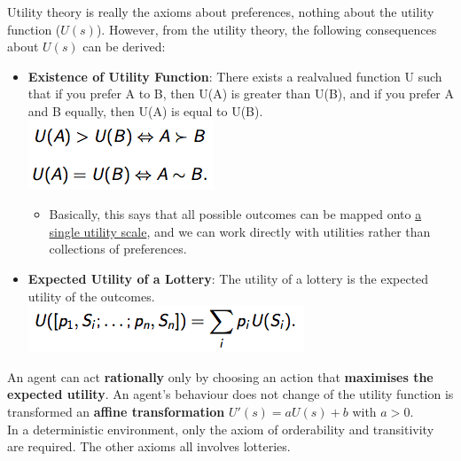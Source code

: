 \documentclass[12pt]{article}
\begin{document}
\begin{tcolorbox}
Utility theory is really the axioms about preferences, nothing about the utility function ($U(s)$). However, from the utility theory,  the following consequences about $U(s)$ can be derived:

\begin{itemize}
\item \textbf{Existence of Utility Function}: There exists a realvalued
function U such that if you prefer A to B, then U(A) is greater than
U(B), and if you prefer A and B equally, then U(A) is equal to U(B). \\

\includegraphics[scale=0.5]{p7}
\begin{itemize}
\item Basically, this says that all possible outcomes can be mapped onto \underline{a single
utility scale}, and we can work directly with utilities rather than collections of
preferences.
\end{itemize}

\item \textbf{Expected Utility of a Lottery}: The utility of a lottery is the expected
utility of the outcomes. \\

\includegraphics[scale=0.5]{p8}

\end{itemize}

An agent can act \textbf{rationally} only by choosing an action that \textbf{maximises the expected utility}.
An agent's behaviour does not change of the utility function is transformed an \textbf{affine transformation} $U'(s) = aU(s) +b$ with $a > 0$.\\

In a deterministic environment, only the axiom of orderability and transitivity are required. The other axioms all involves lotteries. 
\end{tcolorbox}
\end{document}
